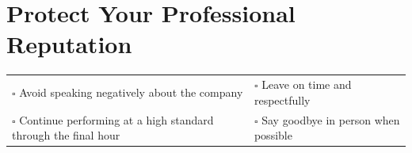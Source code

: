 
\section{Protect Your Professional Reputation}
\label{sec:reputation}

\begin{tabular}{p{9cm} p{8cm}}
$\square$ Avoid speaking negatively about the company & $\square$ Leave on time and respectfully \\ 
$\square$ Continue performing at a high standard through the final hour & $\square$ Say goodbye in person when possible \\ 
\end{tabular}

